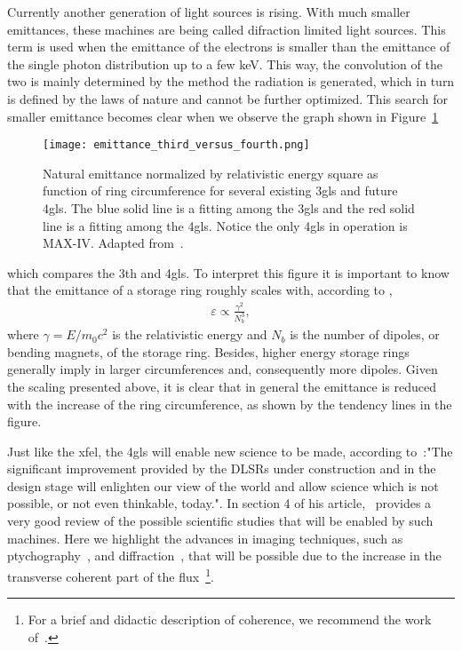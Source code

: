     Currently another generation of light sources is rising. With much smaller emittances, these machines are being called difraction limited light sources. This term is used when the emittance of the electrons is smaller than the emittance of the single photon distribution up to a few \si{\kilo\electronvolt}. This way, the convolution of the two is mainly determined by the method the radiation is generated, which in turn is defined by the laws of nature and cannot be further optimized. This search for smaller emittance becomes clear when we observe the graph shown in Figure~\ref{fig:scaled_emittances}
    \begin{figure}[b!]
        \center
        \texttt{[image: emittance\_third\_versus\_fourth.png]}
        \caption[Comparison of machines emittances.]{Natural emittance normalized by relativistic energy square as function of ring circumference for several existing \gls{3gls} and future \gls{4gls}. The blue solid line is a fitting among the \gls{3gls} and the red solid line is a fitting among the \gls{4gls}. Notice the only \gls{4gls} in operation is MAX-IV. Adapted from~\cite{Liu2017}.}
        \label{fig:scaled_emittances}
    \end{figure}
    which compares the 3th and \gls{4gls}. To interpret this figure it is important to know that the emittance of a storage ring roughly scales with, according to ,
    \begin{align}
        \varepsilon \propto \frac{\gamma^2}{N_b^3},
    \end{align}
    where $\gamma = E/m_0c^2$ is the relativistic energy and $N_b$ is the number of dipoles, or bending magnets, of the storage ring. Besides, higher energy storage rings generally imply in larger circumferences and, consequently more dipoles. Given the scaling presented above, it is clear that in general the emittance is reduced with the increase of the ring circumference, as shown by the tendency lines in the figure.

    Just like the \gls{xfel}, the \gls{4gls} will enable new science to be made, according to~:"The significant improvement provided by the DLSRs under construction and in the design stage will enlighten our view of the world and allow science which is not possible, or not even thinkable, today.". In section 4 of his article,~\citeauthor{Eriksson2014} provides a very good review of the possible scientific studies that will be enabled by such machines. Here we highlight the advances in imaging techniques, such as ptychography~\cite{Thibault2014}, and diffraction~\cite{Hitchcock2014}, that will be possible due to the increase in the transverse coherent part of the flux~\footnote{For a brief and didactic description of coherence, we recommend the work of~.}.

